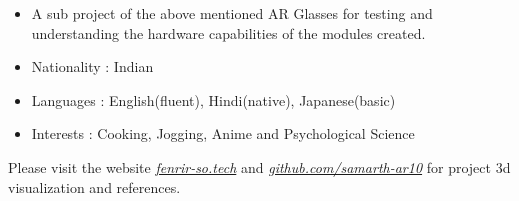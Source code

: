 \begin{itemize}
\item A sub project of the above mentioned AR Glasses for testing and understanding the hardware capabilities of the modules created.
\end{itemize}

\hdashrule{\linewidth}{1pt}{1ex}

\begin{itemize}
    \item Nationality : Indian
    \item Languages : English(fluent), Hindi(native), Japanese(basic)
    \item Interests : Cooking, Jogging, Anime and Psychological Science
    \smallskip
\end{itemize}

 Please visit the website \href{https://fenrir-so.tech}{\large \it fenrir-so.tech} and \href{https://github.com/samarth-ar10}{\large \it github.com/samarth-ar10} for project 3d visualization and references.
    